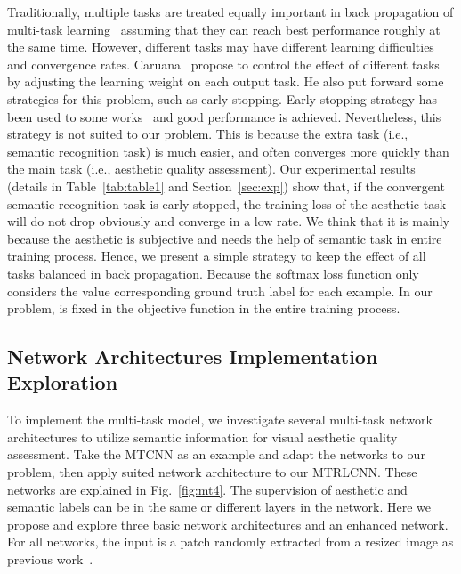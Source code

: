 \documentclass[journal]{IEEEtran}
\begin{document}
Traditionally, multiple tasks are treated equally important in back propagation of multi-task learning~\cite{caruana1997,jung2015rotating} assuming that they can reach best performance roughly at the same time. However, different tasks may have different learning difficulties and convergence rates. Caruana~\cite{caruana1997} propose to control the effect of different tasks by adjusting the learning weight on each output task. He also put forward some strategies for this problem, such as early-stopping. Early stopping strategy has been used to some works~\cite{zhang2014facial} and good performance is achieved. Nevertheless, this strategy is not suited to our problem. This is because the extra task (i.e., semantic recognition task) is much easier, and often converges more quickly than the main task (i.e., aesthetic quality assessment). Our experimental results (details in Table~\ref{tab:table1} and Section~\ref{sec:exp}) show that, if the convergent semantic recognition task is early stopped, the training loss of the aesthetic task will do not drop obviously and converge in a low rate. We think that it is mainly because the aesthetic is subjective and needs the help of semantic task in entire training process. Hence, we present a simple strategy to keep the effect of all tasks balanced in back propagation. Because the softmax loss function only considers the value corresponding ground truth label for each example. In our problem,  is fixed in the objective function in the entire training process.


\subsection{Network Architectures Implementation Exploration}
To implement the multi-task model, we investigate several multi-task network architectures to utilize semantic information for visual aesthetic quality assessment. Take the MTCNN as an example and adapt the networks to our problem, then apply suited network architecture to our MTRLCNN. These networks are explained in Fig.~\ref{fig:mt4}. The supervision of aesthetic and semantic labels can be in the same or different layers in the network. Here we propose and explore three basic network architectures and an enhanced network. For all networks, the input is a  patch randomly extracted from a resized image  as previous work~\cite{lu14}.
\end{document}
